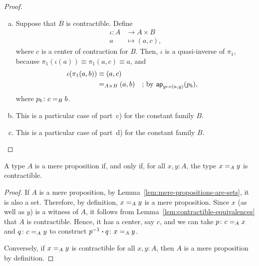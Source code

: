 \begin{proof}
\begin{enumerate}[a)]
        \item Suppose that $B$ is contractible. Define
        \begin{align*}
            \iota\colon A&\to A\times B\\
            a&\mapsto(a,c),
        \end{align*}
        where $c$ is a center of contraction for $B$. Then, $\iota$ is a quasi-inverse of $\pi_1$, because $\pi_1(\iota(a))\equiv\pi_1(a,c)\equiv a$, and
        \begin{align*}
            \iota(\pi_1(a,b))&\equiv(a,c)\\
                &\mathrel{=_{A\times B}}(a,b)
                    &&\text{; by }\mathsf{ap}_{y\mapsto(a,y)}(p_b),
        \end{align*}
        where $p_b\colon c\eq Bb$.

        \item This is a particular case of part~c) for the constant family $B$.

        \item This is a particular case of part~d) for the constant family $B$.
    \end{enumerate}
\end{proof}

\begin{lem}
    A type\/ $A$ is a mere proposition if, and only if, for all\/ $x,y\colon A$, the type\/ $x\mathrel{=_{A}}y$ is contractible.
\end{lem}

\begin{proof}
    If $A$ is a mere proposition, by Lemma~\ref{lem:mere-propositions-are-sets}, it is also a set. Therefore, by definition, $x\mathrel{=_{A}}y$ is a mere proposition. Since $x$ (as well as $y$) is a witness of $A$, it follows from Lemma~\ref{lem:contractible-equivalences} that $A$ is contractible. Hence, it has a center, say $c$, and we can take $p\colon c\eq Ax$ and $q\colon c\eq Ay$ to construct $p^{-1}\ct q\colon x\eq Ay$.

    Conversely, if $x\mathrel{=_{A}}y$ is contractible for all $x,y\colon A$, then $A$ is a mere proposition by definition.
\end{proof}

